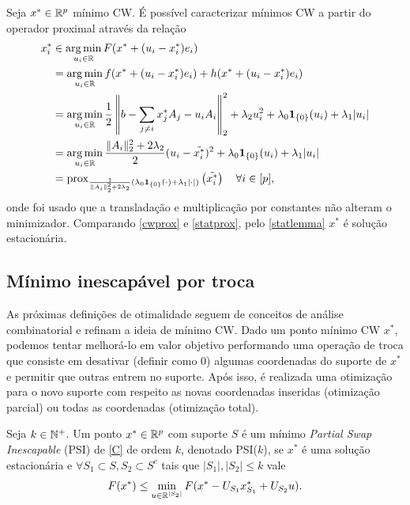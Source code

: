 Seja $x^*\in\mathbb{R}^p$ mínimo CW. É possível caracterizar mínimos CW a partir do operador proximal através da relação
\begin{equation}
    \begin{aligned}
    x_i^*&\in \operatorname*{arg\,min}_{u_i\in\mathbb{R}}F(x^*+(u_i-x_i^*)e_i)\\
    &=\operatorname*{arg\,min}_{u_i\in\mathbb{R}}f(x^*+(u_i-x^*_i)e_i)+h(x^*+(u_i-x^*_i)e_i)\\
    &=\operatorname*{arg\,min}_{u_i\in\mathbb{R}}\frac{1}{2}\left\|b-\sum_{j\neq i}x^*_jA_j-u_iA_i\right\|_2^2+\lambda_2u_i^2+\lambda_0\mathbf{1}_{\{0\}}(u_i)+\lambda_1|u_i|\\
    &=\operatorname*{arg\,min}_{u_i\in\mathbb{R}}\frac{\|A_i\|^2_2+2\lambda_2}{2}(u_i-\tilde{x_i^*})^2+\lambda_0\mathbf{1}_{\{0\}}(u_i)+\lambda_1|u_i|\\
    &=\operatorname{prox}_{\frac{1}{\|A_i\|^2_2+2\lambda_2}(\lambda_0\mathbf{1}_{\{0\}}(\cdot)+\lambda_1|\cdot|)}\left(\tilde{x_i^*}\right)\quad \forall i\in [p],
    \end{aligned}\label{cwprox}
\end{equation}
onde foi usado que a transladação e multiplicação por constantes não alteram o minimizador. Comparando \eqref{cwprox} e \eqref{statprox}, pelo \autoref{statlemma} $x^*$ é solução estacionária.

\subsection{Mínimo inescapável por troca}
As próximas definições de otimalidade seguem de conceitos de análise combinatorial e refinam a ideia de mínimo CW. Dado um ponto mínimo CW $x^*$, podemos tentar melhorá-lo em valor objetivo performando uma operação de troca que consiste em desativar (definir como 0) algumas coordenadas do suporte de $x^*$ e permitir que outras entrem no suporte. Após isso, é realizada uma otimização para o novo suporte com respeito as novas coordenadas inseridas (otimização parcial) ou todas as coordenadas (otimização total).     

\begin{definition}
    Seja $k\in\mathbb{N}^+$. Um ponto $x^*\in\mathbb{R}^p$ com suporte $S$ é um mínimo \textit{Partial Swap Inescapable} (PSI) de \eqref{C} de ordem $k$, denotado PSI($k$), se $x^*$ é uma solução estacionária e $\forall S_1\subset S,S_2\subset S^c$ tais que $|S_1|,|S_2|\leq k$ vale
    \begin{equation}
    F(x^*)\leq\min_{u\in\mathbb{R}^{|S_2|}}F(x^*-U_{S_1}x^*_{S_1}+U_{S_2}u).\label{psi}
    \end{equation}
\end{definition}

